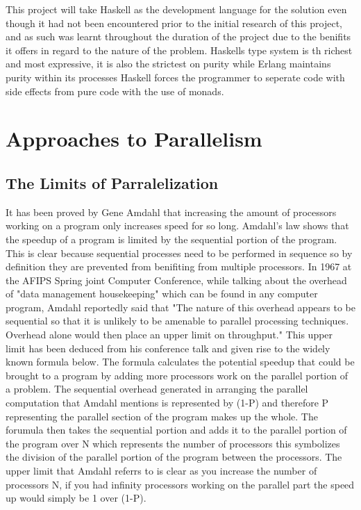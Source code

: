 \documentclass[main.tex]{subfiles}
\begin{document}
{{This project will take Haskell as the development language for the solution even though it had not been encountered prior to the initial research of this project, and as such was learnt throughout the duration of the project due to the benifits it offers in regard to the nature of the problem.
Haskells type system is th richest and most expressive, it is also the strictest on purity while Erlang maintains purity within its processes Haskell forces the programmer to seperate code with side effects from pure code with the use of monads.


\section{Approaches to Parallelism}

\subsection{The Limits of Parralelization}
It has been proved by Gene Amdahl that increasing the amount of processors working on a program only increases speed for so long. Amdahl's law shows that the speedup of a program is limited by the sequential portion of the program. This is clear because sequential processes need to be performed in sequence so by definition they are prevented from benifiting from multiple processors. In 1967 at the AFIPS Spring joint Computer Conference, while talking about the overhead of "data management housekeeping" which can be found in any computer program, Amdahl reportedly said that "The nature of this overhead appears to be sequential so that it is unlikely to be amenable to parallel processing techniques. Overhead alone would then place an upper limit on throughput."\cite{Amdahl1967} This upper limit has been deduced from his conference talk and given rise to the widely known formula below.
The formula calculates the potential speedup that could be brought to a program by adding more processors work on the parallel portion of a problem. The sequential overhead generated in arranging the parallel computation that Amdahl mentions is represented by (1-P) and therefore P representing the parallel section of the program makes up the whole. The forumula then takes the sequential portion and adds it to the parallel portion of the program over N which represents the number of processors this symbolizes the division of the parallel portion of the program between the processors. The upper limit that Amdahl referrs to is clear as you increase the number of processors N, if you had infinity processors working on the parallel part the speed up would simply be 1 over (1-P).
\cite{Amdahl1967}

}}
\end{document}
